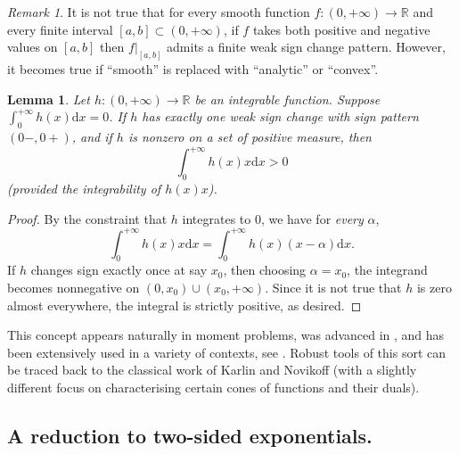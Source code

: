 \documentclass[10pt]{amsart}
\newcommand{\dd}{\mathrm{d}}
\newcommand{\1}{\textbf{1}}
\newcommand{\R}{\mathbb{R}}
\newtheorem{lemma}[theorem]{Lemma}
\theoremstyle{remark}
\newtheorem{remark}[theorem]{Remark}
\theoremstyle{definition}
\begin{document}
\begin{remark}
 It is not true that for every smooth function $f\colon (0,+\infty) \to \R$ and every finite interval $[a,b] \subset (0,+\infty)$, if $f$ takes both positive and negative values on $[a,b]$ then $f\big|_{[a,b]}$ admits a finite weak sign change pattern. However, it becomes true if ``smooth'' is replaced with ``analytic''  or ``convex''.
\end{remark}

\begin{lemma}\label{lm:simple-crossings}
Let $h \colon (0, +\infty) \to \R$ be an integrable function. Suppose $\int_0^{+\infty} h(x) \dd x = 0$. If  $h$ has exactly one weak sign change with sign pattern $(0-,0+)$, and if $h$ is nonzero on a set of positive measure, then
\[ 
\int_0^{+\infty} h(x)x \dd x > 0
 \]
(provided the integrability of $h(x)x$). 
\end{lemma}

\begin{proof}
By the constraint that $h$ integrates to $0$, we have for \emph{every} $\alpha$,
\[ 
\int_0^{+\infty} h(x)x \dd x =  \int_0^{+\infty} h(x)(x-\alpha) \dd x.
 \]
If $h$ changes sign exactly once at say $x_0$, then choosing $\alpha = x_0$, the integrand becomes nonnegative on $(0,x_0)\cup(x_0,+\infty)$. Since it is not true that $h$ is zero almost everywhere, the integral is strictly positive, as desired.
\end{proof}



This concept appears naturally in moment problems, was advanced in \cite{ENT2}, and has been extensively used in a variety of contexts, see \cite{BNZ, BN, CET, Eitan, HNT, mars, melbourne2023discrete, melbourne2023transport, MTY}. Robust tools of this sort can be traced back to the classical work \cite{KN} of Karlin and Novikoff (with a slightly different focus on characterising certain cones of functions and their duals).






\subsection{A reduction to two-sided exponentials.}
\end{document}
